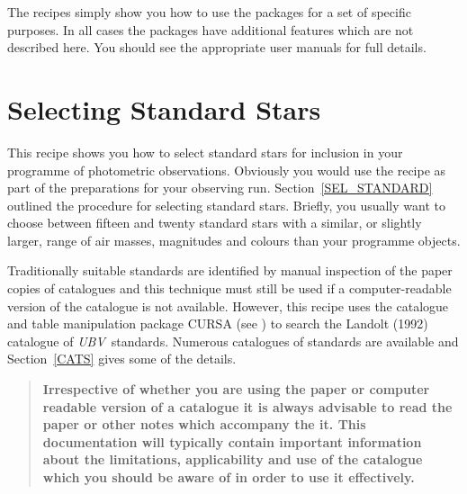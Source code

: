 \documentclass[twoside,11pt,nolof]{starlink}
\begin{document}
The recipes simply show you how to use the packages for a set of
specific purposes.  In all cases the packages have additional features
which are not described here.  You should see the appropriate user
manuals for full details.


\newpage
\section{\label{STANDARDS_RECIP}Selecting
Standard Stars}

This recipe shows you how to select standard stars for inclusion in your
programme of photometric observations.  Obviously you would use the
recipe as part of the preparations for your observing run.
Section~\ref{SEL_STANDARD} outlined the procedure for selecting standard
stars.  Briefly, you usually want to choose between fifteen and twenty
standard stars with a similar, or slightly larger, range of air masses,
magnitudes and colours than your programme objects.

Traditionally suitable standards are identified by manual inspection
of the paper copies of catalogues and this technique must still be used
if a computer-readable version of the catalogue is not available.
However, this recipe uses the catalogue and table manipulation package
CURSA (see \cite{SUN190}) to search the
Landolt (1992)\cite{LANDOLT92} catalogue of \textit{UBV}\, standards.
Numerous catalogues of standards are available and Section~\ref{CATS}
gives some of the details.

\begin{quote}
\textbf{Irrespective of whether you are using the paper or computer
readable version of a catalogue it is always advisable to read the
paper or other notes which accompany the it.  This documentation will
typically contain important information about the limitations,
applicability and use of the catalogue which you should be aware of
in order to use it effectively.}
\end{quote}
\end{document}
